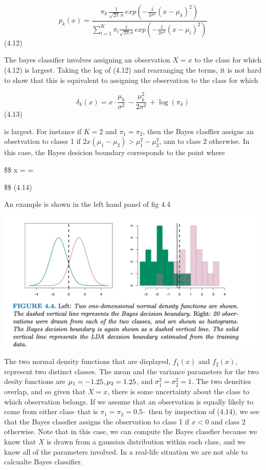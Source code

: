 \documentclass[
  letterpaper,
  DIV=11,
  numbers=noendperiod]{scrreprt}
\begin{document}
{\[
p_k(x) = \frac{
\pi_k\,\frac{1}{\sqrt{2\pi}\,\sigma}\,exp(-\frac{1}{2\sigma^2}(x - \mu_k)^2)
}
{
\sum_{l=1}^K \pi_l \frac{1}{\sqrt{2\pi}\sigma}\,exp(-\frac{1}{2\sigma^2}(x - \mu_l)^2)
}
\] (4.12)

The bayes classifier involves assigning an observation \(X=x\) to the
class for which (4.12) is largest. Taking the log of (4.12) and
rearranging the terms, it is not hard to show that this is equivalent to
assigning the observation to the class for which

\[
\delta_k(x) = x \cdot \frac{\mu_k}{\sigma^2} \,- \frac{\mu_k^2}{2\sigma^2}\,+ \log(\pi_k)
\] (4.13)

is largest. For instance if \(K = 2\) and \(\pi_1 = \pi_2\), then the
Bayes clasffier assigns an obsetvation to classs 1 if
\(2x(\mu_1 - \mu_2) > \mu_1^2 - \mu_2^2\), ann to class 2 otherwise. In
this case, the Bayes desicion boundary corresponds to the point where

\$\$ x = =

\$\$ (4.14)

An example is shown in the left hand panel of fig 4.4

\includegraphics{fig4.4.png}

The two normal density functions that are displayed, \(f_1(x)\) and
\(f_2(x)\), represent two distinct classes. The mean and the variance
parameters for the two desity functions are
\(\mu_1 = -1.25, \space \mu_2 = 1.25\), and
\(\sigma_1^2 = \sigma_2^2 = 1\). The two densities overlap, and so given
that \(X=x\), there is some uncertainty about the class to which
observation belongs. If we assume that an observation is equally likely
to come from either class--that is \(\pi_1 = \pi_2 = 0.5\)-- then by
inspection of (4.14), we see that the Bayes classfier assigns the
observation to class 1 if \(x<0\) and class 2 otherwise. Note that in
this case, we can compute the Bayes classfier because we know that \(X\)
is drawn from a gaussian distribution within each class, and we know all
of the parameters involved. In a real-life situation we are not able to
calcualte Bayes classifier.

}
\end{document}
